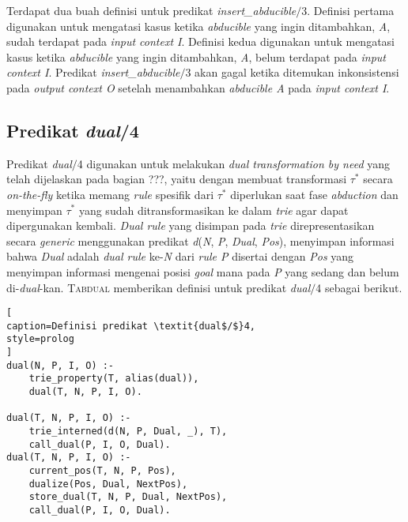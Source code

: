 Terdapat dua buah definisi untuk predikat \textit{insert\_abducible$/$}3. Definisi pertama digunakan untuk mengatasi kasus ketika \textit{abducible} yang ingin ditambahkan, \textit{A}, sudah terdapat pada \textit{input context I}. Definisi kedua digunakan untuk mengatasi kasus ketika \textit{abducible} yang ingin ditambahkan, \textit{A}, belum terdapat pada \textit{input context I}. Predikat \textit{insert\_abducible$/$}3 akan gagal ketika ditemukan inkonsistensi pada \textit{output context O} setelah menambahkan \textit{abducible A} pada \textit{input context I}.

\subsection{Predikat \textit{dual}/4}

Predikat \textit{dual$/$}4 digunakan untuk melakukan \textit{dual transformation by need} yang telah dijelaskan pada bagian ???, yaitu dengan membuat transformasi $\tau^*$ secara \textit{on-the-fly} ketika memang \textit{rule} spesifik dari $\tau^*$ diperlukan saat fase \textit{abduction} dan menyimpan $\tau^*$ yang sudah ditransformasikan ke dalam \textit{trie} agar dapat dipergunakan kembali. \textit{Dual rule} yang disimpan pada \textit{trie} direpresentasikan secara \textit{generic} menggunakan predikat \textit{d}(\textit{N}, \textit{P}, \textit{Dual}, \textit{Pos}), menyimpan informasi bahwa \textit{Dual} adalah \textit{dual rule} ke-\textit{N} dari \textit{rule P} disertai dengan \textit{Pos} yang menyimpan informasi mengenai posisi \textit{goal} mana pada \textit{P} yang sedang dan belum di-\textit{dual}-kan. \textsc{Tabdual} memberikan definisi untuk predikat \textit{dual$/$}4 sebagai berikut.
\\

\begin{lstlisting}[
caption=Definisi predikat \textit{dual$/$}4,
style=prolog
]
dual(N, P, I, O) :-
	trie_property(T, alias(dual)),
	dual(T, N, P, I, O).
	
dual(T, N, P, I, O) :-
	trie_interned(d(N, P, Dual, _), T),
	call_dual(P, I, O, Dual).
dual(T, N, P, I, O) :-
	current_pos(T, N, P, Pos),
	dualize(Pos, Dual, NextPos),
	store_dual(T, N, P, Dual, NextPos),
	call_dual(P, I, O, Dual).
\end{lstlisting}

